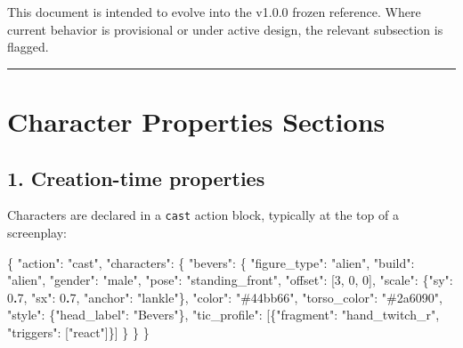\documentclass[
  11pt,
]{book}
\newenvironment{Shaded}{}{}
\newcommand{\DataTypeTok}[1]{\textcolor[rgb]{0.56,0.13,0.00}{#1}}
\newcommand{\DecValTok}[1]{\textcolor[rgb]{0.25,0.63,0.44}{#1}}
\newcommand{\ErrorTok}[1]{\textcolor[rgb]{1.00,0.00,0.00}{\textbf{#1}}}
\newcommand{\FunctionTok}[1]{\textcolor[rgb]{0.02,0.16,0.49}{#1}}
\newcommand{\OtherTok}[1]{\textcolor[rgb]{0.00,0.44,0.13}{#1}}
\newcommand{\StringTok}[1]{\textcolor[rgb]{0.25,0.44,0.63}{#1}}
\begin{document}
This document is intended to evolve into the v1.0.0 frozen reference.
Where current behavior is provisional or under active design, the
relevant subsection is flagged.

\begin{center}\rule{0.5\linewidth}{0.5pt}\end{center}

\section{Character Properties
Sections}\label{character-properties-sections}

\subsection{1. Creation-time properties}\label{creation-time-properties}

Characters are declared in a \texttt{cast} action block, typically at
the top of a screenplay:

\begin{Shaded}
\begin{Highlighting}[]
\FunctionTok{\{}
  \DataTypeTok{"action"}\FunctionTok{:} \StringTok{"cast"}\FunctionTok{,}
  \DataTypeTok{"characters"}\FunctionTok{:} \FunctionTok{\{}
    \DataTypeTok{"bevers"}\FunctionTok{:} \FunctionTok{\{}
      \DataTypeTok{"figure\_type"}\FunctionTok{:} \StringTok{"alien"}\FunctionTok{,}
      \DataTypeTok{"build"}\FunctionTok{:} \StringTok{"alien"}\FunctionTok{,}
      \DataTypeTok{"gender"}\FunctionTok{:} \StringTok{"male"}\FunctionTok{,}
      \DataTypeTok{"pose"}\FunctionTok{:} \StringTok{"standing\_front"}\FunctionTok{,}
      \DataTypeTok{"offset"}\FunctionTok{:} \OtherTok{[}\DecValTok{3}\OtherTok{,} \DecValTok{0}\OtherTok{,} \DecValTok{0}\OtherTok{]}\FunctionTok{,}
      \DataTypeTok{"scale"}\FunctionTok{:} \FunctionTok{\{}\DataTypeTok{"sy"}\FunctionTok{:} \DecValTok{0}\ErrorTok{.}\DecValTok{7}\FunctionTok{,} \DataTypeTok{"sx"}\FunctionTok{:} \DecValTok{0}\ErrorTok{.}\DecValTok{7}\FunctionTok{,} \DataTypeTok{"anchor"}\FunctionTok{:} \StringTok{"lankle"}\FunctionTok{\},}
      \DataTypeTok{"color"}\FunctionTok{:} \StringTok{"\#44bb66"}\FunctionTok{,}
      \DataTypeTok{"torso\_color"}\FunctionTok{:} \StringTok{"\#2a6090"}\FunctionTok{,}
      \DataTypeTok{"style"}\FunctionTok{:} \FunctionTok{\{}\DataTypeTok{"head\_label"}\FunctionTok{:} \StringTok{"Bevers"}\FunctionTok{\},}
      \DataTypeTok{"tic\_profile"}\FunctionTok{:} \OtherTok{[}\FunctionTok{\{}\DataTypeTok{"fragment"}\FunctionTok{:} \StringTok{"hand\_twitch\_r"}\FunctionTok{,} \DataTypeTok{"triggers"}\FunctionTok{:} \OtherTok{[}\StringTok{"react"}\OtherTok{]}\FunctionTok{\}}\OtherTok{]}
    \FunctionTok{\}}
  \FunctionTok{\}}
\FunctionTok{\}}
\end{Highlighting}
\end{Shaded}
\end{document}
